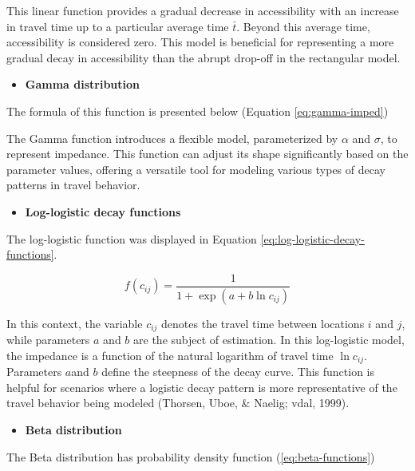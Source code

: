 \documentclass[
11pt, %
oneside, %
english, %
singlespacing, %
]{macthesis} %
\def\tightlist{}
\begin{document}
This linear function provides a gradual decrease in accessibility with an increase in travel time up to a particular average time \(\bar{t}\). Beyond this average time, accessibility is considered zero. This model is beneficial for representing a more gradual decay in accessibility than the abrupt drop-off in the rectangular model.

\begin{itemize}
\tightlist
\item
  \textbf{Gamma distribution}
\end{itemize}

The formula of this function is presented below (Equation \ref{eq:gamma-imped})

The Gamma function introduces a flexible model, parameterized by \(\alpha\) and \(\sigma\), to represent impedance. This function can adjust its shape significantly based on the parameter values, offering a versatile tool for modeling various types of decay patterns in travel behavior.

\begin{itemize}
\tightlist
\item
  \textbf{Log-logistic decay functions}
\end{itemize}

The log-logistic function was displayed in Equation \ref{eq:log-logistic-decay-functions}.

\begin{equation}
f(c_{ij}) = \frac {1}{1+ \exp(a + b\ln c_{ij})}
\label{eq:log-logistic-decay-functions}
\end{equation}

In this context, the variable \(c_{ij}\) denotes the travel time between locations \(i\) and \(j\), while parameters \(a\) and \(b\) are the subject of estimation. In this log-logistic model, the impedance is a function of the natural logarithm of travel time \(\ln c_{ij}\). Parameters \(a\)and \(b\) define the steepness of the decay curve. This function is helpful for scenarios where a logistic decay pattern is more representative of the travel behavior being modeled (Thorsen, Uboe, \& Naelig; vdal, 1999).

\begin{itemize}
\tightlist
\item
  \textbf{Beta distribution}
\end{itemize}

The Beta distribution has probability density function (\ref{eq:beta-functions})
\end{document}
